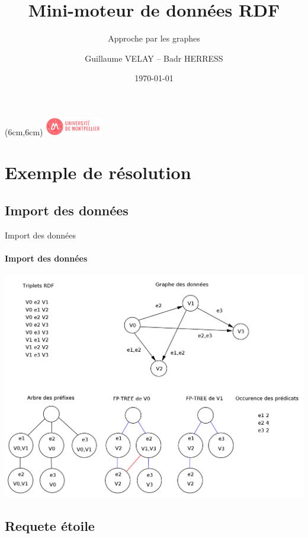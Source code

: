 \documentclass[french]{beamer}
\title[Moteur RDF]{Mini-moteur de données RDF}
\subtitle{Approche par les graphes}
\author[VELAY, HERRESS]{Guillaume VELAY -- Badr HERRESS}
\institute[UM]{\color{white} Université de Montpellier}
\date{\today}
\begin{document}
\begin{frame}
  \titlepage
  \begin{textblock*}{10mm}(6cm,6cm)
    \includegraphics[width=25mm]{images/logo_um.png}
  \end{textblock*}
\end{frame}

\section[Exemple de résolution]{Exemple de résolution}

\subsection[Import des données]{Import des données}

\begin{frame}{Import des données}
  \framesubtitle{Import des données}
  
  \includegraphics[scale=0.7]{images/import.png}

\end{frame}

\subsection[Requete étoile]{Requete étoile}
\end{document}
